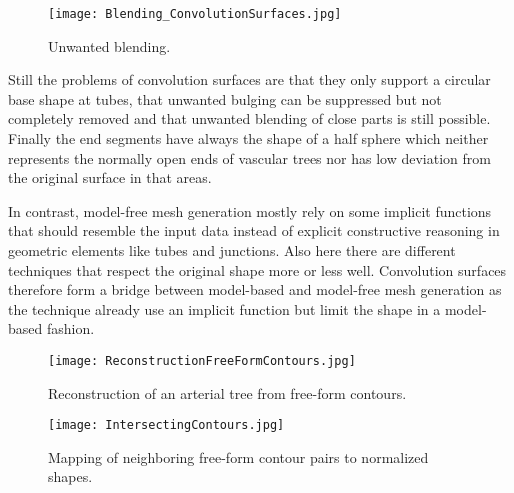 \begin{figure}[h]
	\centering
	\texttt{[image: Blending\_ConvolutionSurfaces.jpg]} \\
	\caption{Unwanted blending.}
	\cite{oeltze2005visualization}
	\label{fig:Blending_ConvolutionSurfaces}
\end{figure}

Still the problems of convolution surfaces are that they only support a circular base shape at tubes, that unwanted bulging can be suppressed but not completely removed and that unwanted blending of close parts is still possible. Finally the end segments have always the shape of a half sphere which neither represents the normally open ends of vascular trees nor has low deviation from the original surface in that areas.

In contrast, model-free mesh generation mostly rely on some implicit functions that should resemble the input data instead of explicit constructive reasoning in geometric elements like tubes and junctions. Also here there are different techniques that respect the original shape more or less well. Convolution surfaces therefore form a bridge between model-based and model-free mesh generation as the technique already use an implicit function but limit the shape in a model-based fashion.

\begin{figure}[h]
	\centering
	\texttt{[image: ReconstructionFreeFormContours.jpg]} \\
	\caption{Reconstruction of an arterial tree from free-form contours.}
	\cite{kretschmer2012reliable}
	\label{fig:ReconstructionFreeFormContours}
\end{figure} 

\begin{figure}[h]
	\centering
	\texttt{[image: IntersectingContours.jpg]} \\
	\caption{Mapping of neighboring free-form contour pairs to normalized shapes.}
	\cite{kretschmer2012reliable}
	\label{fig:IntersectingContours}
\end{figure} 

